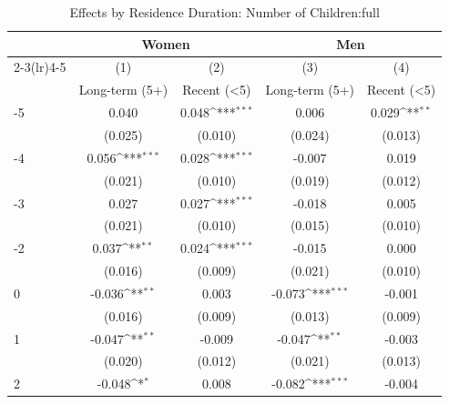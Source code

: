 \begin{table}[htbp]\centering
\def\sym#1{\ifmmode^{#1}\else\(^{#1}\)\fi}
\caption{Effects by Residence Duration: Number of Children:full}
\begin{tabular}{l*{4}{c}}
\hline\hline
            &\multicolumn{2}{c}{Women}                  &\multicolumn{2}{c}{Men}                    \\\cmidrule(lr){2-3}\cmidrule(lr){4-5}
            &\multicolumn{1}{c}{(1)}&\multicolumn{1}{c}{(2)}&\multicolumn{1}{c}{(3)}&\multicolumn{1}{c}{(4)}\\
            &\multicolumn{1}{c}{Long-term (5+)}&\multicolumn{1}{c}{Recent (<5)}&\multicolumn{1}{c}{Long-term (5+)}&\multicolumn{1}{c}{Recent (<5)}\\
\hline
-5          &       0.040         &       0.048\sym{***}&       0.006         &       0.029\sym{**} \\
            &     (0.025)         &     (0.010)         &     (0.024)         &     (0.013)         \\
[1em]
-4          &       0.056\sym{***}&       0.028\sym{***}&      -0.007         &       0.019         \\
            &     (0.021)         &     (0.010)         &     (0.019)         &     (0.012)         \\
[1em]
-3          &       0.027         &       0.027\sym{***}&      -0.018         &       0.005         \\
            &     (0.021)         &     (0.010)         &     (0.015)         &     (0.010)         \\
[1em]
-2          &       0.037\sym{**} &       0.024\sym{***}&      -0.015         &       0.000         \\
            &     (0.016)         &     (0.009)         &     (0.021)         &     (0.010)         \\
[1em]
0           &      -0.036\sym{**} &       0.003         &      -0.073\sym{***}&      -0.001         \\
            &     (0.016)         &     (0.009)         &     (0.013)         &     (0.009)         \\
[1em]
1           &      -0.047\sym{**} &      -0.009         &      -0.047\sym{**} &      -0.003         \\
            &     (0.020)         &     (0.012)         &     (0.021)         &     (0.013)         \\
[1em]
2           &      -0.048\sym{*}  &       0.008         &      -0.082\sym{***}&      -0.004         \\

\end{tabular}
\end{table}
